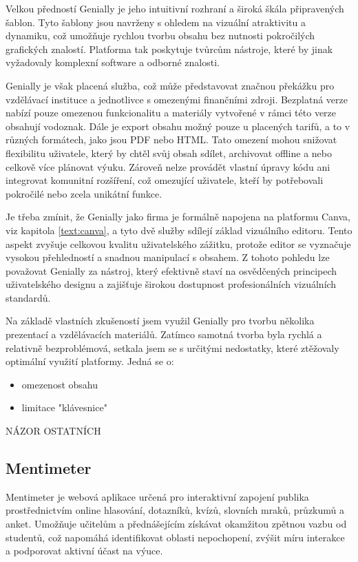 Velkou předností Genially je jeho intuitivní rozhraní a široká škála připravených šablon.
Tyto šablony jsou navrženy s ohledem na vizuální atraktivitu a dynamiku, což umožňuje rychlou tvorbu obsahu bez nutnosti pokročilých grafických znalostí.
Platforma tak poskytuje tvůrcům nástroje, které by jinak vyžadovaly komplexní software a odborné znalosti.

Genially je však placená služba, což může představovat značnou překážku pro vzdělávací instituce a jednotlivce s omezenými finančními zdroji. 
Bezplatná verze nabízí pouze omezenou funkcionalitu a materiály vytvořené v rámci této verze obsahují vodoznak.
Dále je export obsahu možný pouze u placených tarifů, a to v různých formátech, jako jsou PDF nebo HTML. 
Tato omezení mohou snižovat flexibilitu uživatele, který by chtěl svůj obsah sdílet, archivovat offline a nebo celkově více plánovat výuku. 
Zároveň nelze provádět vlastní úpravy kódu ani integrovat komunitní rozšíření, což omezující uživatele, kteří by potřebovali pokročilé nebo zcela unikátní funkce.

Je třeba zmínit, že Genially jako firma je formálně napojena na platformu Canva, viz kapitola \ref{text:canva}, a tyto dvě služby sdílejí základ vizuálního editoru. 
Tento aspekt zvyšuje celkovou kvalitu uživatelského zážitku, protože editor se vyznačuje vysokou přehledností a snadnou manipulací s obsahem. 
Z tohoto pohledu lze považovat Genially za nástroj, který efektivně staví na osvědčených principech uživatelského designu a zajišťuje širokou dostupnost profesionálních vizuálních standardů.

Na základě vlastních zkušeností jsem využil Genially pro tvorbu několika prezentací a vzdělávacích materiálů. 
Zatímco samotná tvorba byla rychlá a relativně bezproblémová, setkala jsem se s určitými nedostatky, které ztěžovaly optimální využití platformy. 
Jedná se o:

\begin{itemize}
    \item omezenost obsahu
    \item limitace "klávesnice"
\end{itemize}

NÁZOR OSTATNÍCH

\subsection{Mentimeter}

Mentimeter je webová aplikace určená pro interaktivní zapojení publika prostřednictvím online hlasování, dotazníků, kvízů, slovních mraků, průzkumů a anket. 
Umožňuje učitelům a přednášejícím získávat okamžitou zpětnou vazbu od studentů, což napomáhá identifikovat oblasti nepochopení, zvýšit míru interakce a podporovat aktivní účast na výuce. 

